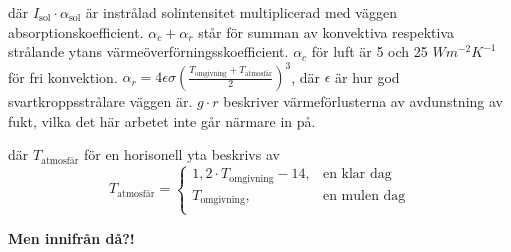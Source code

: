 där 
$I_\text{sol} \cdot \alpha_\text{sol}$ är instrålad solintensitet multiplicerad med väggen absorptionskoefficient.
$\alpha_c+\alpha_r$ står för summan av konvektiva respektiva strålande ytans värmeöverförningsskoefficient.
$\alpha_c$ för luft är 5 och 25 $\unit{W m^{-2}K^{-1}}$ för fri konvektion.
$\alpha_r = 4 \epsilon \sigma \left(\frac{T_\text{omgivning}+T_\text{atmosfär}}{2}\right)^3$, där $\epsilon$ är hur god svartkroppsstrålare väggen är. $g\cdot r$ beskriver värmeförlusterna av avdunstning av fukt, vilka det här arbetet inte går närmare in på.

där $T_\text{atmosfär}$ för en horisonell yta beskrivs av
\begin{equation}
T_\text{atmosfär}= \left\{
\begin{array}{rl}
1,2 \cdot T_\text{omgivning} - 14, & \text{en klar dag} \\
T_\text{omgivning}, & \text{en mulen dag} \\
\end{array} \right.
\end{equation}

\textbf{\color{red}Men innifrån då?!}

